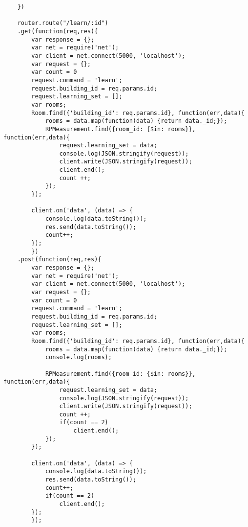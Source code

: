 \begin{lstlisting}
    })

    router.route("/learn/:id")
    .get(function(req,res){
        var response = {};
        var net = require('net');
        var client = net.connect(5000, 'localhost');
        var request = {};
        var count = 0
        request.command = 'learn';
        request.building_id = req.params.id;
        request.learning_set = [];
        var rooms;
        Room.find({'building_id': req.params.id}, function(err,data){
            rooms = data.map(function(data) {return data._id;});
            RPMeasurement.find({room_id: {$in: rooms}}, function(err,data){
                request.learning_set = data;
                console.log(JSON.stringify(request));
                client.write(JSON.stringify(request));
                client.end();
                count ++;   
            });
        });
    
        client.on('data', (data) => {
            console.log(data.toString());
            res.send(data.toString());
            count++;
        });
        })
    .post(function(req,res){
        var response = {};
        var net = require('net');
        var client = net.connect(5000, 'localhost');
        var request = {};
        var count = 0
        request.command = 'learn';
        request.building_id = req.params.id;
        request.learning_set = [];
        var rooms;
        Room.find({'building_id': req.params.id}, function(err,data){
            rooms = data.map(function(data) {return data._id;});
            console.log(rooms);

            RPMeasurement.find({room_id: {$in: rooms}}, function(err,data){
                request.learning_set = data;
                console.log(JSON.stringify(request));
                client.write(JSON.stringify(request));
                count ++;
                if(count == 2)
                    client.end();
            });
        });

        client.on('data', (data) => {
            console.log(data.toString());
            res.send(data.toString());
            count++;
            if(count == 2)
                client.end();
        });
        });


\end{lstlisting}

